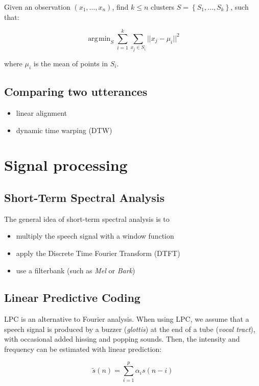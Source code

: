 \documentclass[11pt]{article}
\DeclareMathOperator*{\argmin}{\arg\!\min}
\begin{document}
Given an observation $(x_1, \ldots, x_n)$, find $k \leq n$ clusters $S = \left\{S_1, \ldots, S_k\right\}$, such that:

\[
    \argmin_S \sum\limits_{i = 1}^k \sum\limits_{x_j \in S_i} ||x_j - \mu_i||^2
\]

where $\mu_i$ is the mean of points in $S_i$.

\subsection{Comparing two utterances}

\begin{itemize}
    \item linear alignment
    \item dynamic time warping (DTW)
\end{itemize}

\section{Signal processing}

\subsection{Short-Term Spectral Analysis}

The general idea of short-term spectral analysis is to

\begin{itemize}
    \item multiply the speech signal with a window function
    \item apply the Discrete Time Fourier Transform (DTFT)
    \item use a filterbank (such as \textit{Mel} or \textit{Bark})
\end{itemize}

\subsection{Linear Predictive Coding}

LPC is an alternative to Fourier analysis. When using LPC, we assume that a speech signal is produced by a buzzer (\textit{glottis}) at the end of a tube (\textit{vocal tract}), with occasional added hissing and popping sounds. Then, the intensity and frequency can be estimated with linear prediction:

\begin{equation}
    \tilde{s}(n) = \sum\limits_{i = 1}^p \alpha_i s(n - i)
\end{equation}
\end{document}
